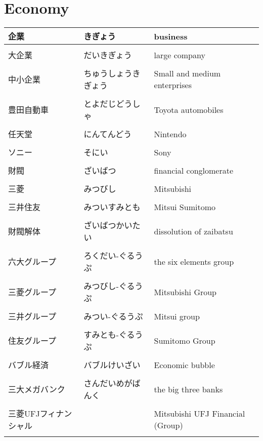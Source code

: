 \documentclass{article}
\newcommand\tabni[1][0.2cm]{\hspace*{#1}}
\begin{document}
\section{ \tabni Economy }
\begin{tabular}{ l | l | p{7.5cm} }
企業 & きぎょう & business \\ \hline \\[-1em]
大企業 & だいきぎょう & large company \\ \hline \\[-1em]
中小企業 & ちゅうしょうきぎょう & Small and medium enterprises \\ \hline \\[-1em]
豊田自動車 & とよだじどうしゃ & Toyota automobiles \\ \hline \\[-1em]
任天堂 & にんてんどう & Nintendo \\ \hline \\[-1em]
ソニー & そにい & Sony \\ \hline \\[-1em]
財閥 & ざいばつ & financial conglomerate \\ \hline \\[-1em]
三菱 & みつびし & Mitsubishi \\ \hline \\[-1em]
三井住友 & みついすみとも & Mitsui Sumitomo \\ \hline \\[-1em]
財閥解体 & ざいばつかいたい & dissolution of zaibatsu \\ \hline \\[-1em]
六大グループ & ろくだい-ぐるうぷ　& the six elements group \\ \hline \\[-1em]
三菱グループ & みつびし-ぐるうぷ & Mitsubishi Group \\ \hline \\[-1em]
三井グループ & みつい-ぐるうぷ　& Mitsui group \\ \hline \\[-1em]
住友グループ & すみとも-ぐるうぷ　& Sumitomo Group \\ \hline \\[-1em]
バブル経済 & バブルけいざい & Economic bubble \\ \hline \\[-1em]
三大メガバンク & さんだいめがばんく & the big three banks \\ \hline \\[-1em]
三菱UFJフィナンシャル && Mitsubishi UFJ Financial (Group) \\ \hline \\[-1em]

\end{tabular}
\end{document}
